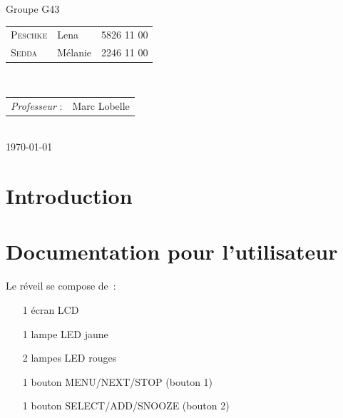 \documentclass[12pt,a4paper]{article}
\begin{document}
\begin{titlepage}

\large
\begin{centering}
Groupe G43\\
\end{centering}
{\begin{tabular}{lll}
\textsc{Peschke} & Lena & 5826 11 00\\
\textsc{Sedda} & Mélanie & 2246 11 00\\
\end{tabular}}
\\[1cm]

\normalsize
{\begin{tabular}{ll}
\textit{Professeur} : & Marc Lobelle \\
\end{tabular}}
\\[1cm]


{\normalsize \today} %

\newpage

\end{titlepage}


\clearpage
\thispagestyle{empty}
\tableofcontents
\clearpage
{}


\section{Introduction}

\section{Documentation pour l'utilisateur}

Le réveil se compose de~:
\begin{itemize}
\item[1] écran LCD
\item[1] lampe LED jaune
\item[2] lampes LED rouges
\item[1] bouton MENU/NEXT/STOP (bouton 1)
\item[1] bouton SELECT/ADD/SNOOZE (bouton 2)
\end{itemize}
\end{document}

